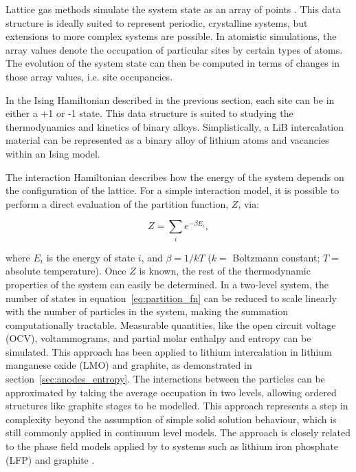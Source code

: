 \documentclass[../main.tex]{subfiles}
\begin{document}
Lattice gas methods simulate the system state as an array of points \cite{Binder2009book}. This data structure is ideally suited to represent periodic, crystalline systems, but extensions to more complex systems are possible. In atomistic simulations, the array values denote the occupation of particular sites by certain types of atoms. The evolution of the system state can then be computed in terms of changes in those array values, i.e. site occupancies.\cite{Binder2009book}
    
In the Ising Hamiltonian described in the previous section, each site can be in either a +1 or -1 state.\cite{lee1952} This data structure is suited to studying the thermodynamics and kinetics of binary alloys.\cite{PMERCER2016394,oviedo2015underpotential} Simplistically, a LiB intercalation material can be represented as a binary alloy of lithium atoms and vacancies within an Ising model.\cite{persson2010,mercer_influence_2017,Kim2001h}   
    
The interaction Hamiltonian describes how the energy of the system depends on the configuration of the lattice. For a simple interaction model, it is possible to perform a direct evaluation of the partition function, $Z$, via:
    
\begin{equation}
        Z = \sum_{i}e^{-\beta E_{i}},
        \label{eq:partition_fn}
\end{equation}

where $E_{i}$ is the energy of state $i$, and $\beta = 1/kT$ ($k =$ Boltzmann constant; $T=$ absolute temperature). Once $Z$ is known, the rest of the thermodynamic properties of the system can easily be determined.\cite{Mercer2019,Leiva2017b,schlueter_quantifying_2018} In a two-level system,\cite{Leiva2017b} the number of states in equation~\ref{eq:partition_fn} can be reduced to scale linearly with the number of particles in the system, making the summation computationally tractable.\cite{Mercer2019,Leiva2017b,schlueter_quantifying_2018} Measurable quantities, like the open circuit voltage (OCV), voltammograms, and partial molar enthalpy and entropy can be simulated.\cite{schlueter_quantifying_2018,Leiva2017b,Mercer2019} This approach has been applied to lithium intercalation in lithium manganese oxide (LMO) \cite{schlueter_quantifying_2018} and graphite,\cite{Mercer2019,Leiva2017b} as demonstrated in section~\ref{sec:anodes_entropy}. The interactions between the particles can be approximated by taking the average occupation in two levels, allowing ordered structures like graphite stages to be modelled. This approach represents a step in complexity beyond the assumption of simple solid solution behaviour, which is still commonly applied in continuum level models. \citeauthor{HAFTBARADARAN2011361} The approach is closely related to the phase field models applied by \citeauthor{Bazant2017} to systems such as lithium iron phosphate (LFP) and graphite \cite{Bazant2017,guo2016,peng2011}.
\end{document}
